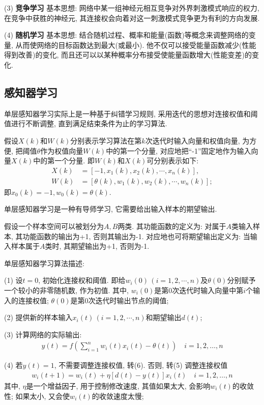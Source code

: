 (3) \textbf{竞争学习} 基本思想: 网络中某一组神经元相互竞争对外界刺激模式响应的权力, 在竞争中获胜的神经元, 其连接权会向着对这一刺激模式竞争更为有利的方向发展.

(4) \textbf{随机学习} 基本思想: 结合随机过程、概率和能量(函数)等概念来调整网络的变量, 从而使网络的目标函数达到最大(或最小). 他不仅可以接受能量函数减少(性能得到改善)的变化, 而且还可以以某种概率分布接受使能量函数增大(性能变差)的变化.
\subsection{感知器学习}

单层感知器学习实际上是一种基于纠错学习规则, 采用迭代的思想对连接权值和阈值进行不断调整, 直到满足结束条件为止的学习算法.

假设$X(k)$和$W(k)$分别表示学习算法在第$k$次迭代时输入向量和权值向量, 为方便, 把阈值$\theta$作为权值向量$W(k)$中的第一个分量, 对应地把“-1”固定地作为输入向量$X(k)$中的第一个分量. 即$W(k)$和$X(k)$可分别表示如下:
\begin{align}
X(k)&=[-1, x_1(k), x_2(k),\cdots, x_n(k)],\\
W(k)&=[\theta(k),w_1(k), w_2(k),\cdots,w_n(k)];
\end{align}
即$x_0(k)=-1, w_0(k)=θ(k)$.

单层感知器学习是一种有导师学习, 它需要给出输入样本的期望输出.

假设一个样本空间可以被划分为$A, B$两类. 其功能函数的定义为: 对属于$A$类输入样本, 其功能函数的输出为+1, 否则其输出为-1. 对应地也可将期望输出定义为: 当输入样本属于$A$类时, 其期望输出为+1, 否则为-1.

单层感知器学习算法描述:

     (1) 设$t=0$, 初始化连接权和阈值. 即给$w_i(0)\,(i=1, 2, \cdots,n)$及$\theta(0)$分别赋予一个较小的非零随机数, 作为初值. 其中, $w_i(0)$是第0次迭代时输入向量中第$i$个输入的连接权值; $\theta(0)$是第0次迭代时输出节点的阈值;

     (2) 提供新的样本输入$x_i(t)\,(i=1, 2,\cdots, n)$和期望输出$d(t)$;

     (3) 计算网络的实际输出:
        \begin{align}
          y(t)=f\left(\sum_{i=1}^{n} w_{i}(t) x_{i}(t)-\theta(t)\right) \quad i=1,2, \ldots, n
        \end{align}

     (4) 若$y(t)=1$, 不需要调整连接权值, 转(6). 否则, 转(5) 调整连接权值
        \begin{align}
          w_{i}(t+1)=w_{i}(t)+\eta[d(t)-y(t)] x_{i}(t) \quad i=1,2, \ldots, n
        \end{align}
        其中, $\eta$是一个增益因子, 用于控制修改速度, 其值如果太大, 会影响$w_i(t)$的收敛性; 如果太小, 又会使$w_i(t)$的收敛速度太慢;

